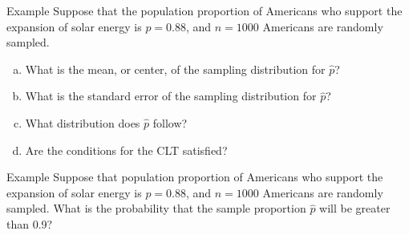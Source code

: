 \documentclass[11pt]{beamer}
\begin{document}
\begin{frame}{Example}
\small
Suppose that the population proportion of Americans who support the expansion of solar energy is $p=0.88$, and $n=1000$ Americans are randomly sampled.
\begin{enumerate}[(a)]
\item What is the mean, or center, of the sampling distribution for $\hat{p}$?
\vspace{0.75cm}
\item What is the standard error of the sampling distribution for $\hat{p}$?
\vspace{1cm}
\item What distribution does $\hat{p}$ follow?
\vspace{1cm}
\item Are the conditions for the CLT satisfied?
\vspace{1.5cm}
\end{enumerate}
\end{frame}

\begin{frame}{Example}
\small
Suppose that population proportion of Americans who support the expansion of solar energy is $p=0.88$, and $n=1000$ Americans are randomly sampled.  What is the probability that the sample proportion $\hat{p}$ will be greater than 0.9?
\vspace{6cm}
\end{frame}
\end{document}
